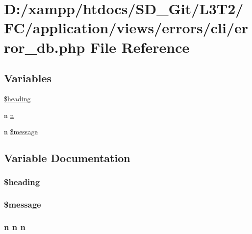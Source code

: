 \hypertarget{cli_2error__db_8php}{}\section{D\+:/xampp/htdocs/\+S\+D\+\_\+\+Git/\+L3\+T2/\+F\+C/application/views/errors/cli/error\+\_\+db.php File Reference}
\label{cli_2error__db_8php}
\subsection*{Variables}
\begin{DoxyCompactItemize}
\item 
\hyperlink{cli_2error__db_8php_a196169be7715d466e3310388b096598c}{\$heading}
\item 
n \hyperlink{cli_2error__db_8php_ace0fd03cd383f20ce6ea63247a207294}{n}
\item 
\hyperlink{cli_2error__general_8php_ace0fd03cd383f20ce6ea63247a207294}{n} \hyperlink{cli_2error__db_8php_aaba2b6aee423b3b5e46000f90b4c8c7f}{\$message}
\end{DoxyCompactItemize}


\subsection{Variable Documentation}
\hypertarget{cli_2error__db_8php_a196169be7715d466e3310388b096598c}{}
\subsubsection[{\$heading}]{\setlength{\rightskip}{0pt plus 5cm}\$heading}\label{cli_2error__db_8php_a196169be7715d466e3310388b096598c}
\hypertarget{cli_2error__db_8php_aaba2b6aee423b3b5e46000f90b4c8c7f}{}
\subsubsection[{\$message}]{ \$message}\label{cli_2error__db_8php_aaba2b6aee423b3b5e46000f90b4c8c7f}
\hypertarget{cli_2error__db_8php_ace0fd03cd383f20ce6ea63247a207294}{}
\subsubsection[{n}]{\setlength{\rightskip}{0pt plus 5cm}n n n}\label{cli_2error__db_8php_ace0fd03cd383f20ce6ea63247a207294}
